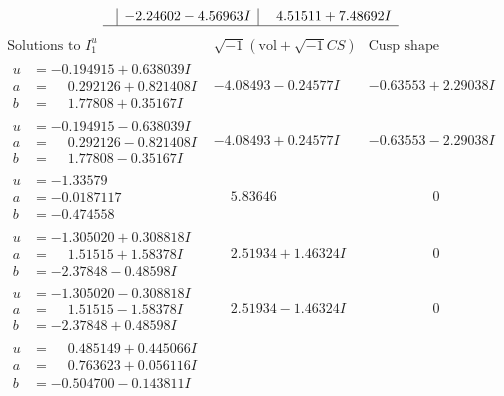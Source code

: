 \documentclass[1p]{elsarticle_modified}
\theoremstyle{definition}
\newcommand{\I}{\sqrt{-1}}
\begin{document}
$$\begin{array}{c|c|c}
 & -2.24602 - 4.56963 I & \phantom{-}4.51511 + 7.48692 I\\
 \hline 
 \end{array}$$\newpage$$\begin{array}{c|c|c}  
\text{Solutions to }I^u_{1}& \I (\text{vol} + \sqrt{-1}CS) & \text{Cusp shape}\\
 \hline 
\begin{aligned}
u &= -0.194915 + 0.638039 I \\
a &= \phantom{-}0.292126 + 0.821408 I \\
b &= \phantom{-}1.77808 + 0.35167 I\end{aligned}
 & -4.08493 - 0.24577 I & -0.63553 + 2.29038 I \\ \hline\begin{aligned}
u &= -0.194915 - 0.638039 I \\
a &= \phantom{-}0.292126 - 0.821408 I \\
b &= \phantom{-}1.77808 - 0.35167 I\end{aligned}
 & -4.08493 + 0.24577 I & -0.63553 - 2.29038 I \\ \hline\begin{aligned}
u &= -1.33579\phantom{ +0.000000I} \\
a &= -0.0187117\phantom{ +0.000000I} \\
b &= -0.474558\phantom{ +0.000000I}\end{aligned}
 & \phantom{-}5.83646\phantom{ +0.000000I} & \phantom{-0.000000 } 0 \\ \hline\begin{aligned}
u &= -1.305020 + 0.308818 I \\
a &= \phantom{-}1.51515 + 1.58378 I \\
b &= -2.37848 - 0.48598 I\end{aligned}
 & \phantom{-}2.51934 + 1.46324 I & \phantom{-0.000000 } 0 \\ \hline\begin{aligned}
u &= -1.305020 - 0.308818 I \\
a &= \phantom{-}1.51515 - 1.58378 I \\
b &= -2.37848 + 0.48598 I\end{aligned}
 & \phantom{-}2.51934 - 1.46324 I & \phantom{-0.000000 } 0 \\ \hline\begin{aligned}
u &= \phantom{-}0.485149 + 0.445066 I \\
a &= \phantom{-}0.763623 + 0.056116 I \\
b &= -0.504700 - 0.143811 I\end{aligned}

\end{array}$$
\end{document}
